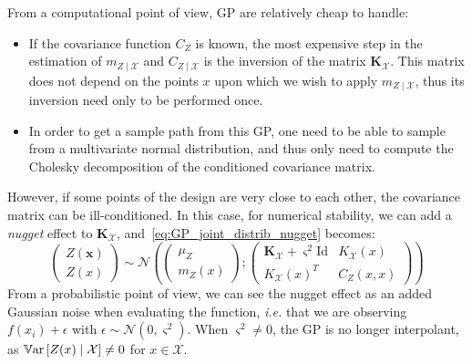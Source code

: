 \documentclass[../../Main_ManuscritThese.tex]{subfiles}
\begin{document}
From a computational point of view, GP are relatively cheap to handle:
\begin{itemize}
\item If the covariance function $C_Z$ is known, the most expensive step in the estimation of $m_{Z\mid \mathcal{X}}$ and $C_{Z \mid \mathcal{X}}$ is the inversion of the matrix $\mathbf{K}_{\mathcal{X}}$. This matrix does not depend on the points $x$ upon which we wish to apply $m_{Z\mid \mathcal{X}}$, thus its inversion need only to be performed once.%
\item In order to get a sample path from this GP, one need to be able to sample from a multivariate normal distribution, and thus only need to compute the Cholesky decomposition of the conditioned covariance matrix.
\end{itemize}
However, if some points of the design are very close to each other, the covariance matrix can be ill-conditioned. In this case,
for numerical stability, we can add a \emph{nugget} effect to $\mathbf{K}_{\mathcal{X}}$, and~\eqref{eq:GP_joint_distrib_nugget} becomes:
\begin{equation}
  \label{eq:GP_joint_distrib_nugget}
  \begin{pmatrix}
    Z(\mathbf{x}) \\
    Z(x)
  \end{pmatrix} \sim
  \mathcal{N}\left(
    \begin{pmatrix}
      \mu_Z \\
      m_{Z}(x)
    \end{pmatrix} ;
    \begin{pmatrix}
      \mathbf{K}_{\mathcal{X}} + \varsigma^2\mathrm{Id}& K_{\mathcal{X}}(x) \\
       K_{\mathcal{X}}(x)^T & C_Z(x, x)
    \end{pmatrix}
\right)
\end{equation}
From a probabilistic point of view, we can see the nugget effect as an added Gaussian noise when evaluating the function,\emph{ i.e.} that we are observing $f(x_i)+\epsilon$ with $\epsilon \sim \mathcal{N}(0, \varsigma^2)$. When $\varsigma^2 \neq 0$, the GP is no longer interpolant, as $\mathbb{V}\mathrm{ar}\left[Z(x) \mid \mathcal{X}\right] \neq 0$ for $x\in \mathcal{X}$.
\end{document}
